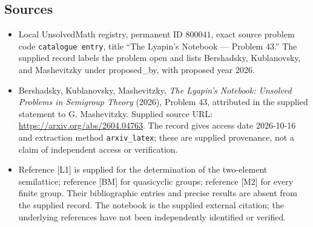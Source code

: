 \documentclass[11pt]{article}
\begin{document}
\subsection{Sources}
\begin{itemize}
\item Local UnsolvedMath registry, permanent ID \(800041\), exact source problem code \texttt{catalogue entry}, title ``The Lyapin's Notebook --- Problem 43.'' The supplied record labels the problem open and lists Bershadsky, Kublanovsky, and Mashevitzky under proposed\_by, with proposed year 2026.
\item Bershadsky, Kublanovsky, Mashevitzky, \emph{The Lyapin's Notebook: Unsolved Problems in Semigroup Theory} (2026), Problem 43, attributed in the supplied statement to G. Mashevitzky. Supplied source URL: \url{https://arxiv.org/abs/2604.04763}. The record gives access date 2026-10-16 and extraction method \texttt{arxiv\_latex}; these are supplied provenance, not a claim of independent access or verification.
\item Reference [L1] is supplied for the determination of the two-element semilattice; reference [BM] for quasicyclic groups; reference [M2] for every finite group. Their bibliographic entries and precise results are absent from the supplied record. The notebook is the supplied external citation; the underlying references have not been independently identified or verified.
\end{itemize}
\end{document}
